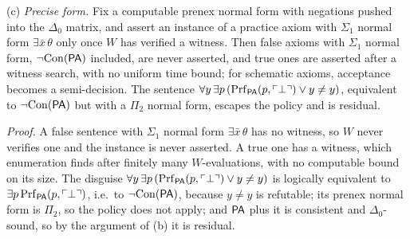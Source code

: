 (c) \emph{Precise form.} Fix a computable prenex normal form with negations pushed into the $\Delta_0$ matrix, and assert an instance of a practice axiom with $\Sigma_1$ normal form $\exists\bar x\,\theta$ only once $W$ has verified a witness. Then false axioms with $\Sigma_1$ normal form, $\neg\mathrm{Con}(\mathsf{PA})$ included, are never asserted, and true ones are asserted after a witness search, with no uniform time bound; for schematic axioms, acceptance becomes a semi-decision. The sentence $\forall y\,\exists p\,(\mathrm{Prf}_{\mathsf{PA}}(p,\ulcorner\bot\urcorner)\vee y\neq y)$, equivalent to $\neg\mathrm{Con}(\mathsf{PA})$ but with a $\Pi_2$ normal form, escapes the policy and is residual.

\emph{Proof.} A false sentence with $\Sigma_1$ normal form $\exists\bar x\,\theta$ has no witness, so $W$ never verifies one and the instance is never asserted. A true one has a witness, which enumeration finds after finitely many $W$-evaluations, with no computable bound on its size. The disguise $\forall y\,\exists p\,(\mathrm{Prf}_{\mathsf{PA}}(p,\ulcorner\bot\urcorner)\vee y\neq y)$ is logically equivalent to $\exists p\,\mathrm{Prf}_{\mathsf{PA}}(p,\ulcorner\bot\urcorner)$, i.e.\ to $\neg\mathrm{Con}(\mathsf{PA})$, because $y\neq y$ is refutable; its prenex normal form is $\Pi_2$, so the policy does not apply; and $\mathsf{PA}$ plus it is consistent and $\Delta_0$-sound, so by the argument of (b) it is residual.

